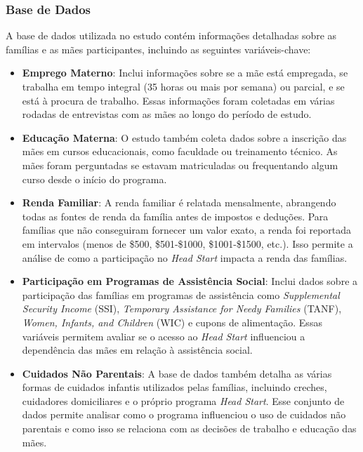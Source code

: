 \documentclass[a4paper,12pt]{article}[abntex2]
\begin{document}
\subsubsection*{Base de Dados}

A base de dados utilizada no estudo contém informações detalhadas sobre as famílias e as mães participantes, incluindo as seguintes variáveis-chave:

\begin{itemize}
    \item \textbf{Emprego Materno}: Inclui informações sobre se a mãe está empregada, se trabalha em tempo integral (35 horas ou mais por semana) ou parcial, e se está à procura de trabalho. Essas informações foram coletadas em várias rodadas de entrevistas com as mães ao longo do período de estudo.
    
    \item \textbf{Educação Materna}: O estudo também coleta dados sobre a inscrição das mães em cursos educacionais, como faculdade ou treinamento técnico. As mães foram perguntadas se estavam matriculadas ou frequentando algum curso desde o início do programa.
    
    \item \textbf{Renda Familiar}: A renda familiar é relatada mensalmente, abrangendo todas as fontes de renda da família antes de impostos e deduções. Para famílias que não conseguiram fornecer um valor exato, a renda foi reportada em intervalos (menos de \$500, \$501-\$1000, \$1001-\$1500, etc.). Isso permite a análise de como a participação no \textit{Head Start} impacta a renda das famílias.
    
    \item \textbf{Participação em Programas de Assistência Social}: Inclui dados sobre a participação das famílias em programas de assistência como \textit{Supplemental Security Income} (SSI), \textit{Temporary Assistance for Needy Families} (TANF), \textit{Women, Infants, and Children} (WIC) e cupons de alimentação. Essas variáveis permitem avaliar se o acesso ao \textit{Head Start} influenciou a dependência das mães em relação à assistência social.
    
    \item \textbf{Cuidados Não Parentais}: A base de dados também detalha as várias formas de cuidados infantis utilizados pelas famílias, incluindo creches, cuidadores domiciliares e o próprio programa \textit{Head Start}. Esse conjunto de dados permite analisar como o programa influenciou o uso de cuidados não parentais e como isso se relaciona com as decisões de trabalho e educação das mães.
\end{itemize}
\end{document}
